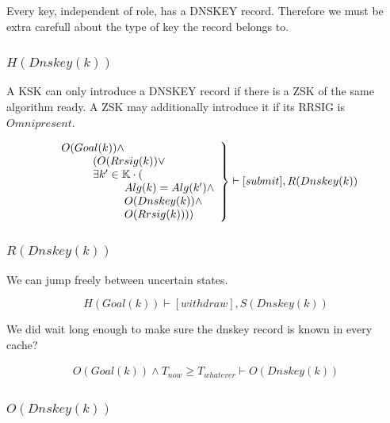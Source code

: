 \documentclass[twoside,english, a4paper]{article}
\newcommand{\mathbox}[1]{#1}
\begin{document}
Every key, independent of role, has a DNSKEY record. Therefore we must
be extra carefull about the type of key the record belongs to.

\subsubsection{$H(Dnskey(k))$}

\mathbox{

	A KSK can only introduce a DNSKEY record if there is a ZSK of the
	same algorithm ready. A ZSK may additionally introduce it if its 
	RRSIG is $Omnipresent$.

	\begin{equation}
		\left.
		\begin{array}{l}
			O(Goal(k)) \wedge \\
\hskip 1cm	(O(Rrsig(k)) \vee \\
\hskip 1cm	\exists k' \in \mathbb{K} \cdot ( \\
\hskip 2cm		Alg(k)=Alg(k') \wedge \\
\hskip 2cm		O(Dnskey(k)) \wedge \\
\hskip 2cm		O(Rrsig(k))))\\
		\end{array}
		\right\} \vdash [submit], R(Dnskey(k))
	\end{equation}
}

\subsubsection{$R(Dnskey(k))$}

\mathbox{

	We can jump freely between uncertain states.
	
	\begin{equation}
			H(Goal(k)) \vdash [withdraw], S(Dnskey(k))
	\end{equation}

	We did wait long enough to make sure the dnskey record is known in 
	every cache?
	
	\begin{equation}
		\begin{split}
			O(Goal(k)) \wedge T_{now} \geq T_{whatever} \vdash O(Dnskey(k))
		\end{split}
	\end{equation}
}

\subsubsection{$O(Dnskey(k))$}
\end{document}
